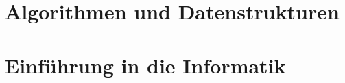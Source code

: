 \section{Algorithmen und Datenstrukturen}\label{sec:algods-2021}


\section{Einführung in die Informatik}\label{sec:einfinf-2021-2022}

